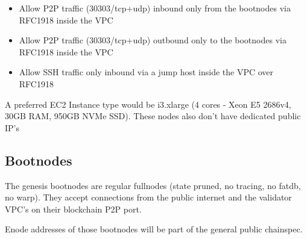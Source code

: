 \begin{itemize}
    \item Allow P2P traffic (30303/tcp+udp) inbound only from the bootnodes via RFC1918 inside the VPC
    \item Allow P2P traffic (30303/tcp+udp) outbound only to the bootnodes via RFC1918 inside the VPC
    \item Allow SSH traffic only inbound via a jump host inside the VPC over RFC1918
\end{itemize}

A preferred EC2 Instance type would be i3.xlarge (4 cores - Xeon E5 2686v4, 30GB RAM, 950GB NVMe SSD). These nodes also don't have dedicated public IP's

\subsection{Bootnodes}

The genesis bootnodes are regular fullnodes (state pruned, no tracing, no fatdb, no warp).
They accept connections from the public internet and the validator VPC's on their blockchain P2P port.

Enode addresses of those bootnodes will be part of the general public chainspec.

